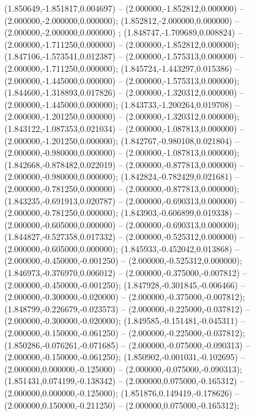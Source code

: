  (1.850649,-1.851817,0.004697) -- (2.000000,-1.852812,0.000000) -- (2.000000,-2.000000,0.000000);
 (1.852812,-2.000000,0.000000) -- (2.000000,-2.000000,0.000000) ;
 (1.848747,-1.709689,0.008824) -- (2.000000,-1.711250,0.000000) -- (2.000000,-1.852812,0.000000);
 (1.847106,-1.573541,0.012387) -- (2.000000,-1.575313,0.000000) -- (2.000000,-1.711250,0.000000);
 (1.845724,-1.443297,0.015386) -- (2.000000,-1.445000,0.000000) -- (2.000000,-1.575313,0.000000);
 (1.844600,-1.318893,0.017826) -- (2.000000,-1.320312,0.000000) -- (2.000000,-1.445000,0.000000);
 (1.843733,-1.200264,0.019708) -- (2.000000,-1.201250,0.000000) -- (2.000000,-1.320312,0.000000);
 (1.843122,-1.087353,0.021034) -- (2.000000,-1.087813,0.000000) -- (2.000000,-1.201250,0.000000);
 (1.842767,-0.980108,0.021804) -- (2.000000,-0.980000,0.000000) -- (2.000000,-1.087813,0.000000);
 (1.842668,-0.878482,0.022019) -- (2.000000,-0.877813,0.000000) -- (2.000000,-0.980000,0.000000);
 (1.842824,-0.782429,0.021681) -- (2.000000,-0.781250,0.000000) -- (2.000000,-0.877813,0.000000);
 (1.843235,-0.691913,0.020787) -- (2.000000,-0.690313,0.000000) -- (2.000000,-0.781250,0.000000);
 (1.843903,-0.606899,0.019338) -- (2.000000,-0.605000,0.000000) -- (2.000000,-0.690313,0.000000);
 (1.844827,-0.527358,0.017332) -- (2.000000,-0.525312,0.000000) -- (2.000000,-0.605000,0.000000);
 (1.845933,-0.452042,0.013868) -- (2.000000,-0.450000,-0.001250) -- (2.000000,-0.525312,0.000000);
 (1.846973,-0.376970,0.006012) -- (2.000000,-0.375000,-0.007812) -- (2.000000,-0.450000,-0.001250);
 (1.847928,-0.301845,-0.006466) -- (2.000000,-0.300000,-0.020000) -- (2.000000,-0.375000,-0.007812);
 (1.848799,-0.226679,-0.023573) -- (2.000000,-0.225000,-0.037812) -- (2.000000,-0.300000,-0.020000);
 (1.849585,-0.151481,-0.045311) -- (2.000000,-0.150000,-0.061250) -- (2.000000,-0.225000,-0.037812);
 (1.850286,-0.076261,-0.071685) -- (2.000000,-0.075000,-0.090313) -- (2.000000,-0.150000,-0.061250);
 (1.850902,-0.001031,-0.102695) -- (2.000000,0.000000,-0.125000) -- (2.000000,-0.075000,-0.090313);
 (1.851431,0.074199,-0.138342) -- (2.000000,0.075000,-0.165312) -- (2.000000,0.000000,-0.125000);
 (1.851876,0.149419,-0.178626) -- (2.000000,0.150000,-0.211250) -- (2.000000,0.075000,-0.165312);
